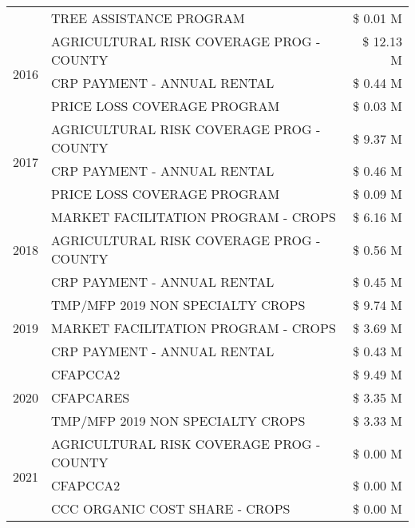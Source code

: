 \begin{tabular}{llr}
 & TREE ASSISTANCE PROGRAM & \$ 0.01 M \\
\cline{1-3}
\multirow[t]{3}{*}{2016} & AGRICULTURAL RISK COVERAGE PROG - COUNTY      & \$ 12.13 M \\
 & CRP PAYMENT - ANNUAL RENTAL                   & \$ 0.44 M \\
 & PRICE LOSS COVERAGE PROGRAM                   & \$ 0.03 M \\
\cline{1-3}
\multirow[t]{3}{*}{2017} & AGRICULTURAL RISK COVERAGE PROG - COUNTY & \$ 9.37 M \\
 & CRP PAYMENT - ANNUAL RENTAL & \$ 0.46 M \\
 & PRICE LOSS COVERAGE PROGRAM & \$ 0.09 M \\
\cline{1-3}
\multirow[t]{3}{*}{2018} & MARKET FACILITATION PROGRAM - CROPS & \$ 6.16 M \\
 & AGRICULTURAL RISK COVERAGE PROG - COUNTY & \$ 0.56 M \\
 & CRP PAYMENT - ANNUAL RENTAL & \$ 0.45 M \\
\cline{1-3}
\multirow[t]{3}{*}{2019} & TMP/MFP 2019 NON SPECIALTY CROPS & \$ 9.74 M \\
 & MARKET FACILITATION PROGRAM - CROPS & \$ 3.69 M \\
 & CRP PAYMENT - ANNUAL RENTAL & \$ 0.43 M \\
\cline{1-3}
\multirow[t]{3}{*}{2020} & CFAPCCA2 & \$ 9.49 M \\
 & CFAPCARES & \$ 3.35 M \\
 & TMP/MFP 2019 NON SPECIALTY CROPS & \$ 3.33 M \\
\cline{1-3}
\multirow[t]{3}{*}{2021} & AGRICULTURAL RISK COVERAGE PROG - COUNTY & \$ 0.00 M \\
 & CFAPCCA2 & \$ 0.00 M \\
 & CCC ORGANIC COST SHARE - CROPS & \$ 0.00 M \\
\cline{1-3}
\bottomrule
\end{tabular}
